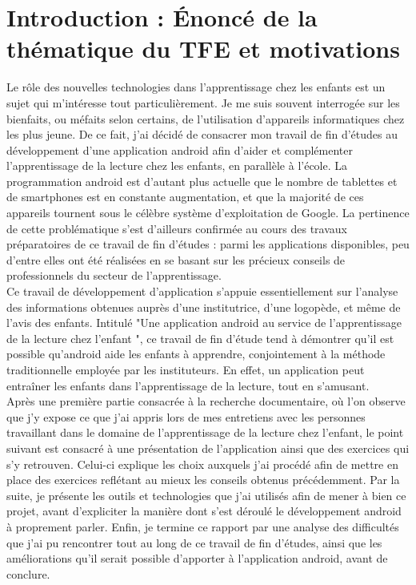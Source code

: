 \section{Introduction : Énoncé de la thématique du TFE et motivations}
Le rôle des nouvelles technologies dans l'apprentissage chez les enfants est un sujet qui m'intéresse tout particulièrement. Je me suis souvent interrogée sur les bienfaits, ou méfaits selon certains, de l'utilisation d'appareils informatiques chez les plus jeune. De ce fait, j'ai décidé de consacrer mon travail de fin d'études au développement d'une application android afin d'aider et complémenter l'apprentissage de la lecture chez les enfants, en parallèle à l'école. La programmation android est d'autant plus actuelle que le nombre de tablettes et de smartphones est en constante augmentation, et que la majorité de ces appareils tournent sous le célèbre système d'exploitation de Google. La pertinence de cette problématique s'est d'ailleurs confirmée au cours des travaux préparatoires de ce travail de fin d'études : parmi les applications disponibles, peu d'entre elles ont été réalisées en se basant sur les précieux conseils de professionnels du secteur de l'apprentissage.\\

Ce travail de développement d'application s'appuie essentiellement sur l'analyse des informations obtenues auprès d'une institutrice, d'une logopède, et même de l'avis des enfants. Intitulé "Une application android au service de l'apprentissage de la lecture chez l'enfant ", ce travail de fin d'étude tend à démontrer qu'il est possible qu'android aide les enfants à apprendre, conjointement à la méthode traditionnelle employée par les instituteurs. En effet, un application peut entraîner les enfants dans l'apprentissage de la lecture, tout en s'amusant.\\

Après une première partie consacrée à la recherche documentaire, où l'on observe que j'y expose ce que j'ai appris lors de mes entretiens avec les personnes travaillant dans le domaine de l'apprentissage de la lecture chez l'enfant, le point suivant est consacré à une présentation de l'application ainsi que des exercices qui s'y retrouven. Celui-ci explique les choix auxquels j'ai procédé afin de mettre en place des exercices reflétant au mieux les conseils obtenus précédemment. Par la suite, je présente les outils et technologies que j'ai utilisés afin de mener à bien ce projet, avant d'expliciter la manière dont s'est déroulé le développement android à proprement parler. Enfin, je termine ce rapport par une analyse des difficultés que j'ai pu rencontrer tout au long de ce travail de fin d'études, ainsi que les améliorations qu'il serait possible d'apporter à l'application android, avant de conclure.